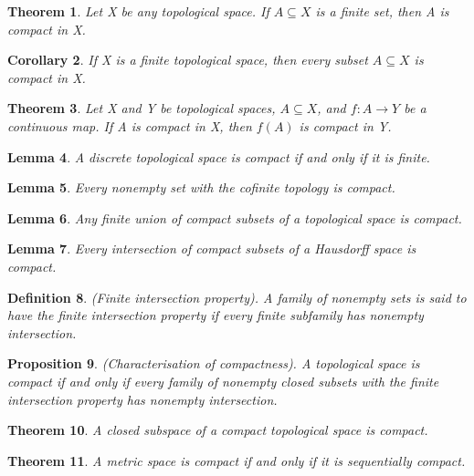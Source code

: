 \documentclass[twoside]{article}
\newcounter{lecnum}
\newtheorem{theorem}{Theorem}[lecnum]
\newtheorem{lemma}[theorem]{Lemma}
\newtheorem{proposition}[theorem]{Proposition}
\newtheorem{corollary}[theorem]{Corollary}
\newtheorem{definition}[theorem]{Definition}
\begin{document}
\begin{theorem} Let X be any topological space. If $A \subseteq X$ is a finite set, then A is compact in X.
\end{theorem}

\begin{corollary}If X is a finite topological space, then every subset $A \subseteq X$ is compact in X.
\end{corollary}

\begin{theorem}Let X and Y be topological spaces, $A \subseteq X$, and $f: A \rightarrow Y$ be a continuous map. If A is compact in X, then $f(A)$ is compact in Y.
\end{theorem}

\begin{lemma}A discrete topological space is compact if and only if it is finite.
\end{lemma}

\begin{lemma}Every nonempty set with the cofinite topology is compact.
\end{lemma}

\begin{lemma}Any finite union of compact subsets of a topological space is compact.
\end{lemma}

\begin{lemma}Every intersection of compact subsets of a Hausdorff space is compact.
\end{lemma}

\begin{definition}(Finite intersection property). A family of nonempty sets is said to have the finite intersection property if every finite subfamily has nonempty intersection.
\end{definition}

\begin{proposition}(Characterisation of compactness). A topological space is compact if and only if every family of nonempty closed subsets with the finite intersection property has nonempty intersection.
\end{proposition}

\begin{theorem}A closed subspace of a compact topological space is compact.
\end{theorem}

\begin{theorem} A metric space is compact if and only if it is sequentially compact.
\end{theorem}
\end{document}
